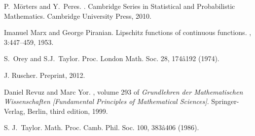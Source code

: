 \documentclass[11pt, reqno]{amsart}
\theoremstyle{plain}
\theoremstyle{definition}
\theoremstyle{remark}
\begin{document}
\begin{thebibliography}{4}
P.~M\"{o}rters and Y.~Peres.
.
\newblock Cambridge Series in Statistical and Probabilistic Mathematics.
  Cambridge University Press, 2010.

Imanuel Marx and George Piranian.
\newblock Lipschitz functions of continuous functions.
, 3:447--459, 1953.

S.~Orey and S.J.~Taylor.
\newblock Proc. London Math. Soc. 28, 174â192 (1974).

J. Ruscher.
\newblock Preprint, 2012.

Daniel Revuz and Marc Yor.
, volume 293 of
  {\em Grundlehren der Mathematischen Wissenschaften [Fundamental Principles of
  Mathematical Sciences]}.
\newblock Springer-Verlag, Berlin, third edition, 1999.

S. J.~Taylor.
\newblock Math. Proc. Camb. Phil. Soc. 100, 383â406 (1986).
\end{thebibliography}
\end{document}
